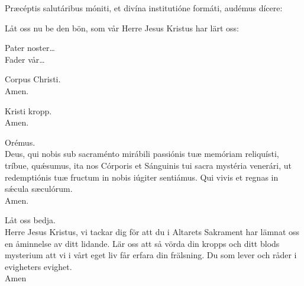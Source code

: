 \begin{multicols}{2}
\renewcommand{\columnseprulecolor}{\color{rubrica}}
\renewcommand{\columnseprule}{0.4pt}
\va Præcéptis salutáribus móniti, et divína institutióne formáti, audémus
dícere:
\columnbreak

\va Låt oss nu be den bön, som vår Herre Jesus Kristus har lärt oss:
\end{multicols}

\smallskip
{}

\begin{multicols}{2}
\renewcommand{\columnseprulecolor}{\color{rubrica}}
\renewcommand{\columnseprule}{0.4pt}
Pater noster\ldots\\
Fader vår\ldots
\end{multicols}

\smallskip
{}



\smallskip
{}

\begin{multicols}{2}
\renewcommand{\columnseprulecolor}{\color{rubrica}}
\renewcommand{\columnseprule}{0.4pt}
\va Corpus Christi.\\
\ra Amen.
\columnbreak

\va Kristi kropp.\\
\ra Amen.
\end{multicols}

\smallskip
{}


\begin{multicols}{2}
\renewcommand{\columnseprulecolor}{\color{rubrica}}
\renewcommand{\columnseprule}{0.4pt}
Orémus.\\
Deus, qui nobis sub sacraménto mirábili passiónis tuæ memóriam
reliquísti, tríbue, qu\'\ae sumus, ita nos Córporis et Sánguinis tui
sacra mystéria venerári, ut redemptiónis tuæ fructum in nobis
iúgiter sentiámus. Qui vivis et regnas in s\' \ae cula sæculórum.\\
\ra Amen.

\columnbreak

Låt oss bedja.\\
Herre Jesus Kristus, vi tackar dig för att du i Altarets Sakrament har lämnat oss en åminnelse av ditt lidande. Lär oss att så vörda din kropps och ditt blods mysterium att vi i vårt eget liv får erfara din frälsning. Du som lever och råder i evigheters evighet.\\
\ra Amen

\end{multicols}

